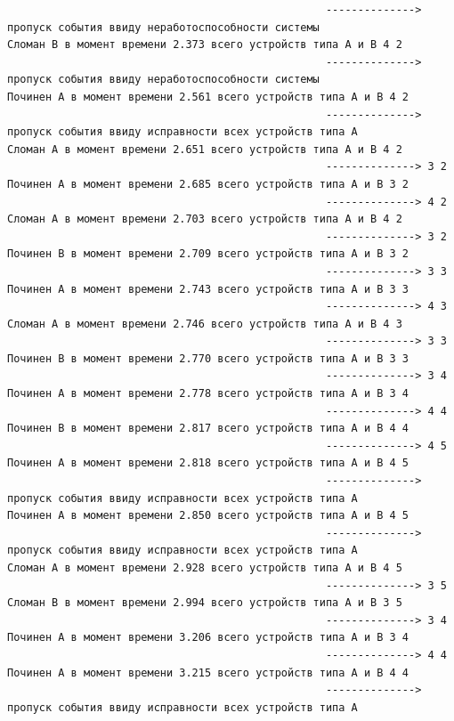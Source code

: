 \begin{verbatim}
                                                  --------------> пропуск события ввиду неработоспособности системы
Сломан B в момент времени 2.373 всего устройств типа А и В 4 2
                                                  --------------> пропуск события ввиду неработоспособности системы
Починен A в момент времени 2.561 всего устройств типа А и В 4 2
                                                  --------------> пропуск события ввиду исправности всех устройств типа А
Сломан A в момент времени 2.651 всего устройств типа А и В 4 2
                                                  --------------> 3 2
Починен A в момент времени 2.685 всего устройств типа А и В 3 2
                                                  --------------> 4 2
Сломан A в момент времени 2.703 всего устройств типа А и В 4 2
                                                  --------------> 3 2
Починен B в момент времени 2.709 всего устройств типа А и В 3 2
                                                  --------------> 3 3
Починен A в момент времени 2.743 всего устройств типа А и В 3 3
                                                  --------------> 4 3
Сломан A в момент времени 2.746 всего устройств типа А и В 4 3
                                                  --------------> 3 3
Починен B в момент времени 2.770 всего устройств типа А и В 3 3
                                                  --------------> 3 4
Починен A в момент времени 2.778 всего устройств типа А и В 3 4
                                                  --------------> 4 4
Починен B в момент времени 2.817 всего устройств типа А и В 4 4
                                                  --------------> 4 5
Починен A в момент времени 2.818 всего устройств типа А и В 4 5
                                                  --------------> пропуск события ввиду исправности всех устройств типа А
Починен A в момент времени 2.850 всего устройств типа А и В 4 5
                                                  --------------> пропуск события ввиду исправности всех устройств типа А
Сломан A в момент времени 2.928 всего устройств типа А и В 4 5
                                                  --------------> 3 5
Сломан B в момент времени 2.994 всего устройств типа А и В 3 5
                                                  --------------> 3 4
Починен A в момент времени 3.206 всего устройств типа А и В 3 4
                                                  --------------> 4 4
Починен A в момент времени 3.215 всего устройств типа А и В 4 4
                                                  --------------> пропуск события ввиду исправности всех устройств типа А

\end{verbatim}
